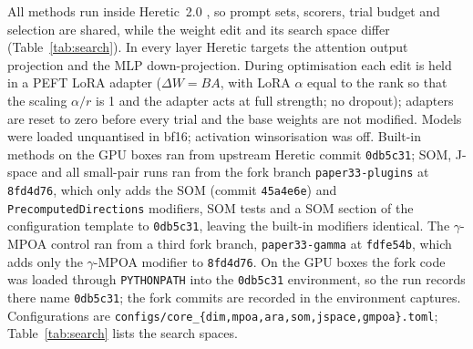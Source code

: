 All methods run inside Heretic~2.0 \cite{heretic2025}, so prompt sets,
scorers, trial budget and selection are shared, while the weight edit and its
search space differ (Table~\ref{tab:search}). In every layer Heretic targets the attention output projection
and the MLP down-projection. During optimisation each edit is held in a PEFT
LoRA adapter \cite{hu2022lora} ($\Delta W=BA$, with LoRA $\alpha$ equal to the
rank so that the scaling $\alpha/r$ is 1 and the adapter acts at full strength;
no dropout); adapters are reset to zero before every
trial and the base weights are not modified. Models were loaded unquantised in
bf16; activation winsorisation was off. Built-in methods on the GPU boxes ran
from upstream Heretic commit \texttt{0db5c31}; SOM, J-space and all small-pair
runs ran from the fork branch \texttt{paper33-plugins} at \texttt{8fd4d76},
which only adds the SOM (commit \texttt{45a4e6e}) and
\texttt{PrecomputedDirections} modifiers, SOM tests and a SOM section of the
configuration template to \texttt{0db5c31}, leaving the built-in modifiers
identical. The $\gamma$-MPOA control ran from a third fork branch,
\texttt{paper33-gamma} at \texttt{fdfe54b}, which adds only the $\gamma$-MPOA
modifier to \texttt{8fd4d76}. On the GPU boxes the fork code was loaded
through \texttt{PYTHONPATH} into the \texttt{0db5c31} environment, so the run
records there name \texttt{0db5c31}; the fork commits are recorded in the
environment captures. Configurations are
\texttt{configs/core\_\{dim,mpoa,ara,som,jspace,gmpoa\}.toml};
Table~\ref{tab:search} lists the search spaces.

